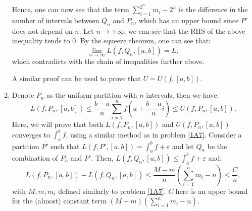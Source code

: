 \begin{enumerate}[label=\textbf{1A.\arabic*}]
  Hence, one can now see that the term \( \sum_{i = 1}^{2^{n}} m_{i} - 2^{n} \)
  is the difference in the number of intervals between \( Q_{n} \) and \( P_{n}
  \), which has an upper bound since \( P' \) does not depend on \( n \). Let \(
  n \to  +\infty \), we can see that the RHS of the above inequality tends
  to \( 0 \). By the squeeze theorem, one can see that:
  \[
    \lim_{n \to \infty} L(f, Q_{n}, [a, b]) = L
  ,\] which contradicts with the chain of inequalities further above.

  A similar proof can be used to prove that \( U = U(f, [a, b]) \).
\item \label{1A10} Denote \( P_{n} \) as the uniform partition with \( n \)
  intervals, then we have:
  \[
    L(f, P_{n}, [a, b]) \le \frac{b-a}{n}\sum_{i = 1}^{n} f\left( a +
    \frac{b-a}{n}i \right)  \le U(f, P_{n}, [a, b])
  .\]
  Here, we will prove that both \( L(f, P_{n}, [a, b]) \) and \( U(f, P_{n}, [a,
  b]) \) converges to \( \int _{a}^{b} f \), using a similar method as in
  problem \ref{1A7}. Consider a partition \( P' \) such that \( L(f, P', [a, b])
  = \int _{a}^{b} f + \varepsilon\) and let \( Q_{n} \) be the combination of \(
  P_{n}\) and \( P' \). Then, \( L(f, Q_{n}, [a, b]) \le \int _{a}^{b} f +
  \varepsilon \) and:
  \[
    L(f, P_{n}, [a, b]) - L(f, Q_{n}, [a, b]) \le \frac{M - m}{n} \left( \sum_{i
    = 1}^{n} m_{i} - n\right) \le \frac{C}{n}
  ,\] with \( M, m, m_{i} \) defined similarly to problem \ref{1A7}. \( C \)
  here is an upper bound for the (almost) constant term \( (M - m) \left( \sum_{i =
  1}^{n} m_{i} - n   \right)  \).


\end{enumerate}
